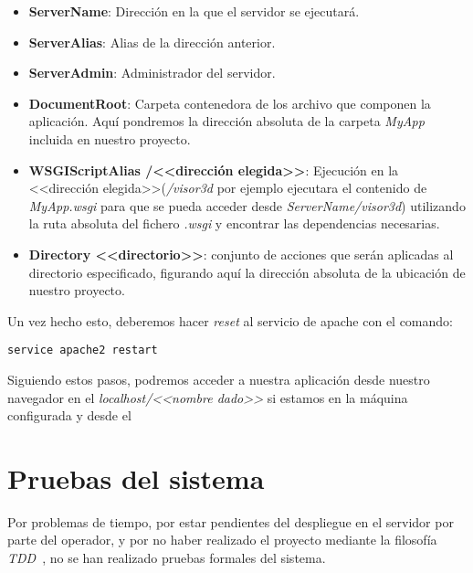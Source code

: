 \begin{itemize}
	\item \textbf{ServerName}: Dirección en la que el servidor se ejecutará.
	\item \textbf{ServerAlias}: Alias de la dirección anterior.
	\item \textbf{ServerAdmin}: Administrador del servidor.
	\item \textbf{DocumentRoot}: Carpeta contenedora de los archivo que componen la aplicación. Aquí pondremos la dirección absoluta de la carpeta \textit{MyApp} incluida en nuestro proyecto.
	\item \textbf{WSGIScriptAlias /<<dirección elegida>>}: Ejecución en la <<dirección elegida>>(\textit{/visor3d} por ejemplo ejecutara el contenido de \textit{MyApp.wsgi} para que se pueda acceder desde \textit{ServerName/visor3d}) utilizando la ruta absoluta del fichero \textit{.wsgi} y encontrar las dependencias necesarias.
	\item \textbf{Directory <<directorio>>}: conjunto de acciones que serán aplicadas al directorio especificado, figurando aquí la dirección absoluta de la ubicación de nuestro proyecto.
\end{itemize}

Un vez hecho esto, deberemos hacer \textit{reset} al servicio de apache con el comando:

\noindent\verb|service apache2 restart|

Siguiendo estos pasos, podremos acceder a nuestra aplicación desde nuestro navegador en el \textit{localhost/<<nombre dado>>} si estamos en la máquina configurada y desde el

\section{Pruebas del sistema}
Por problemas de tiempo, por estar pendientes del despliegue en el servidor por parte del operador, y por no haber realizado el proyecto mediante la filosofía \textit{TDD}~\cite{wiki:TDD}, no se han realizado pruebas formales del sistema.